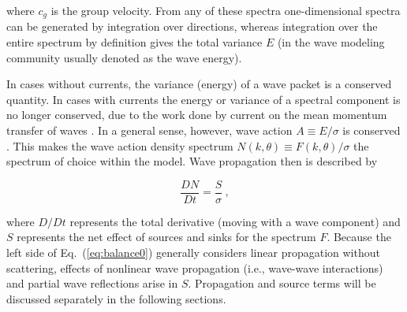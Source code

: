 \noindent 
where $c_g$ is the group velocity.  From any of these spectra
one-dimensional spectra can be generated by integration over directions,
whereas integration over the entire spectrum by definition gives the total
variance $E$ (in the wave modeling community usually denoted as the wave
energy).

In cases without currents, the variance (energy) of a wave packet is a
conserved quantity. In cases with currents the energy or variance of a
spectral component is no longer conserved, due to the work done by current on
the mean momentum transfer of waves \citep{art:LHS61,art:LHS62}. In a general
sense, however, wave action $A \equiv E/\sigma$ is conserved
\citep[e.g.,][]{art:Whi65,art:BG68}. This makes the wave action density
spectrum $N(k,\theta) \equiv F(k,\theta)/\sigma$ the spectrum of choice within
the model. Wave propagation then is described by


\begin{equation}
\frac{D N}{D t} = \frac{S}{\sigma} \: ,
\label{eq:balance0}
\end{equation}

\noindent 
where $D/Dt$ represents the total derivative (moving with a wave component)
and $S$ represents the net effect of sources and sinks for the spectrum
$F$. Because the left side of Eq.~(\ref{eq:balance0}) generally considers
linear propagation without scattering, effects of nonlinear wave propagation
(i.e., wave-wave interactions) and partial wave reflections arise in
$S$. Propagation and source terms will be discussed separately in the
following sections.
